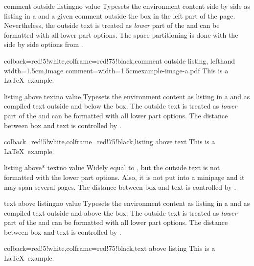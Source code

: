 \begin{docTcbKey}{comment outside listing}{}{no value}
Typesets the environment content side by side as listing in a 
and a given comment outside the box in the left part of the page.
Nevertheless, the outside text is treated as \emph{lower} part of the
 and can be formatted with all lower part options.
The space partitioning is done with the side by side options from
.
\begin{dispExample}
\begin{tcblisting}{colback=red!5!white,colframe=red!75!black,comment outside listing,
  lefthand width=1.5cm,image comment={width=1.5cm}{example-image-a.pdf}}
This is a \LaTeX\ example.
\end{tcblisting}
\end{dispExample}
\end{docTcbKey}



\begin{docTcbKey}{listing above text}{}{no value}
  Typesets the environment content as listing in a 
  and as compiled text outside and below the box.
  The outside text is treated as \emph{lower} part of the
   and can be formatted with all lower part options.
  The distance between box and text is controlled by .
\begin{dispExample}
\begin{tcblisting}{colback=red!5!white,colframe=red!75!black,listing above text}
This is a \LaTeX\ example.
\end{tcblisting}
\end{dispExample}
\end{docTcbKey}


\begin{docTcbKey}[][doc new=2014-11-07]{listing above* text}{}{no value}
  Widely equal to , but the outside text is
  not formatted with the lower part options.
  Also, it is not put into a minipage and it may span several pages.
  The distance between box and text is controlled by .
\end{docTcbKey}

\clearpage

\begin{docTcbKey}{text above listing}{}{no value}
  Typesets the environment content as listing in a 
  and as compiled text outside and above the box.
  The outside text is treated as \emph{lower} part of the
   and can be formatted with all lower part options.
  The distance between box and text is controlled by .
\begin{dispExample}
\begin{tcblisting}{colback=red!5!white,colframe=red!75!black,text above listing}
This is a \LaTeX\ example.
\end{tcblisting}
\end{dispExample}
\end{docTcbKey}


